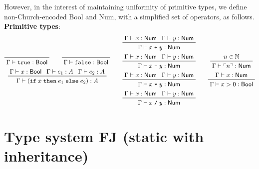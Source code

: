 \documentclass[11pt]{article}
\begin{document}
However, in the interest of maintaining uniformity of primitive types, we define non-Church-encoded \textsf{Bool} and \textsf{Num}, with a simplified set of operators, as follows. \\[3mm]
\textbf{Primitive types}: \begin{gather*}
\begin{gathered}
	\prftree{}{\Gamma \vdash \texttt{true} : \textsf{Bool}} \qquad
	\prftree{}{\Gamma \vdash \texttt{false}: \textsf{Bool}} \\
	\prftree{\Gamma \vdash x : \textsf{Bool}}{\Gamma \vdash e_1 : A}{\Gamma \vdash e_2 : A}{\Gamma \vdash (\texttt{if}\;x\;\texttt{then}\;e_1\;\texttt{else}\;e_2) : A}
\end{gathered}
	\qquad
\begin{gathered}
	\prftree{\Gamma \vdash x : \textsf{Num}}{\Gamma \vdash y : \textsf{Num}}{\Gamma \vdash x\;\texttt{+}\;y : \textsf{Num}} \\
	\prftree{\Gamma \vdash x : \textsf{Num}}{\Gamma \vdash y : \textsf{Num}}{\Gamma \vdash x\;\texttt{-}\;y : \textsf{Num}} \\
	\prftree{\Gamma \vdash x : \textsf{Num}}{\Gamma \vdash y : \textsf{Num}}{\Gamma \vdash x\;\texttt{*}\;y : \textsf{Num}} \\
	\prftree{\Gamma \vdash x : \textsf{Num}}{\Gamma \vdash y : \textsf{Num}}{\Gamma \vdash x\;\texttt{/}\;y : \textsf{Num}}
\end{gathered}
	\qquad
\begin{gathered}
	\prftree{n \in \mathbb{N}}{\Gamma \vdash \ulcorner n \urcorner : \textsf{Num}} \\
	\prftree{\Gamma \vdash x : \textsf{Num}}{\Gamma \vdash x > 0 : \textsf{Bool}}
\end{gathered}
\end{gather*}

\section{Type system FJ (static with inheritance)}
\end{document}
